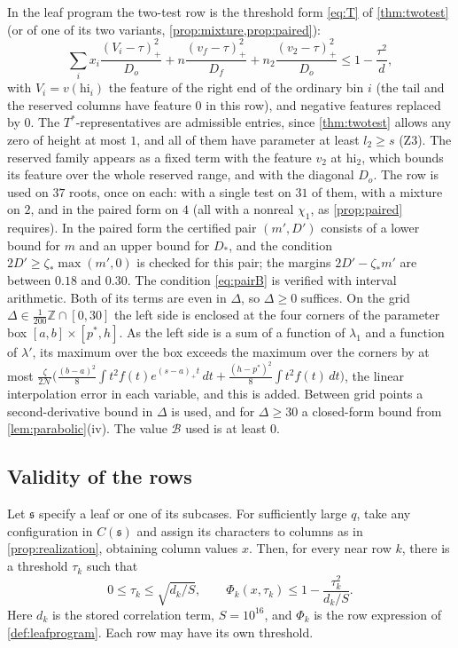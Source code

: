 \documentclass[11pt]{amsart}
\numberwithin{equation}{section}
\theoremstyle{plain}
\theoremstyle{definition}
\theoremstyle{remark}
\newcommand{\ZZ}{\mathbb{Z}}
\newcommand{\hi}{\mathrm{hi}}
\newcommand{\1}{\mathbf{1}}
\begin{document}
In the leaf program the two-test row is the threshold form \eqref{eq:T} of \cref{thm:twotest} (or of one of
its two variants, \cref{prop:mixture,prop:paired}):
\[
  \sum_ix_i\frac{(V_i-\tau)_+^2}{D_o}+n\frac{(v_f-\tau)_+^2}{D_f}+n_2\frac{(v_2-\tau)_+^2}{D_o}\le1-\frac{\tau^2}d,
\]
with $V_i=v(\hi_i)$ the feature of the right end of the ordinary bin $i$ (the tail and the
reserved columns have feature $0$ in this row), and negative features replaced by $0$. The
$T^*$-representatives are admissible entries, since \cref{thm:twotest} allows any zero of height at
most $1$, and all of them have parameter at least $l_2\ge s$ (Z3). The reserved family appears as a
fixed term with the feature $v_2$ at $\hi_2$, which bounds its feature over the whole reserved range,
and with the diagonal $D_o$. The row is used on $37$ roots, once on each: with a single test on $31$
of them, with a mixture on $2$, and in the paired form on $4$ (all with a nonreal $\chi_1$, as
\cref{prop:paired} requires). In the paired form the certified pair $(m',D')$ consists of a lower
bound for $m$ and an upper bound for $D_*$, and the condition $2D'\ge\zeta_*\max(m',0)$ is checked for
this pair; the margins $2D'-\zeta_*m'$ are between $0.18$ and $0.30$. The condition \eqref{eq:pairB} is
verified with interval arithmetic. Both of its terms are even in $\Delta$, so $\Delta\ge0$ suffices. On the grid
$\Delta\in\frac1{200}\ZZ\cap[0,30]$ the left side is enclosed at the four corners of the parameter box
$[a,b]\times[p^*,h]$. As the left side is a sum of a function of $\lambda_1$ and a function of $\lambda'$, its
maximum over the box exceeds the maximum over the corners by at most
$\frac\zeta{2\mathcal N}\bigl(\frac{(b-a)^2}8\int t^2f(t)e^{(s-a)_+t}\,dt+\frac{(h-p^*)^2}8\int t^2f(t)\,dt\bigr)$, the linear
interpolation error in each variable, and this is added. Between grid points a
second-derivative bound in $\Delta$ is used, and for $\Delta\ge30$ a closed-form bound from
\cref{lem:parabolic}(iv). The value $\mathcal B$ used is at least $0$.

\subsection{Validity of the rows}

\begin{proposition}\label{prop:rowsvalid}
Let $\mathfrak s$ specify a leaf or one of its subcases. For sufficiently large $q$,
take any configuration in $C(\mathfrak s)$ and assign its characters to columns as in
\cref{prop:realization}, obtaining column values $x$. Then, for every near row $k$,
there is a threshold $\tau_k$ such that
\[
  0\le\tau_k\le\sqrt{d_k/S},\qquad
  \Phi_k(x,\tau_k)\le1-\frac{\tau_k^2}{d_k/S}.
\]
Here $d_k$ is the stored correlation term, $S=10^{16}$, and $\Phi_k$ is the row expression of
\cref{def:leafprogram}. Each row may have its own threshold.
\end{proposition}
\end{document}
